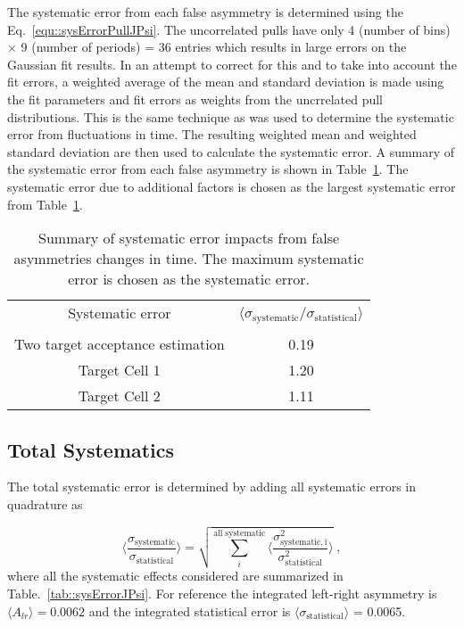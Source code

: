 The systematic error from each false asymmetry is determined using the
Eq.~\ref{equ::sysErrorPullJPsi}.  The uncorrelated pulls have only 4 (number of
bins) $\times$ 9 (number of periods) = 36 entries which results in large errors
on the Gaussian fit results.  In an attempt to correct for this and to take into
account the fit errors, a weighted average of the mean and standard deviation is
made using the fit parameters and fit errors as weights from the uncrrelated
pull distributions.  This is the same technique as was used to determine the
systematic error from fluctuations in time.  The resulting weighted mean and
weighted standard deviation are then used to calculate the systematic error.  A
summary of the systematic error from each false asymmetry is shown in
Table~\ref{tab::faSysJPsi}.  The systematic error due to additional factors is
chosen as the largest systematic error from Table~\ref{tab::faSysJPsi}.

\begin{table}[h!t]
  \centering
  \begin{tabular}{|c|c|}
    \hline Systematic error& \multirow{2}{9em}{$\langle
      \sigma_{\mathrm{systematic}}/\sigma_{\mathrm{statistical}}
      \rangle$}\\ & \\ \hline

    Two target acceptance estimation& 0.19\\ \hline
    
    Target Cell 1& 1.20\\ \hline

    Target Cell 2& 1.11\\ \hline
    
  \end{tabular}
  \caption{Summary of systematic error impacts from false asymmetries changes in
    time.  The maximum systematic error is chosen as the systematic error.}
  \label{tab::faSysJPsi}
\end{table}

\subsection{Total Systematics}
The total systematic error is determined by adding all systematic errors in
quadrature as

\begin{equation}
  \Big \langle \frac{
    \sigma_{\mathrm{systematic}}}{\sigma_{\mathrm{statistical}}} \Big \rangle =
  \sqrt{ \sum_i^{\mathrm{all \; systematic}} \Big \langle
    \frac{\sigma^2_{\mathrm{systematic, i}}}{\sigma^2_{\mathrm{statistical}}}
    \Big \rangle } \;,
\end{equation}
where all the systematic effects considered are summarized in
Table.~\ref{tab::sysErrorJPsi}.  For reference the integrated left-right
asymmetry is $\langle A_{lr} \rangle = 0.0062$ and the integrated statistical
error is $\langle \sigma_{\mathrm{statistical}} \rangle$ = 0.0065.

